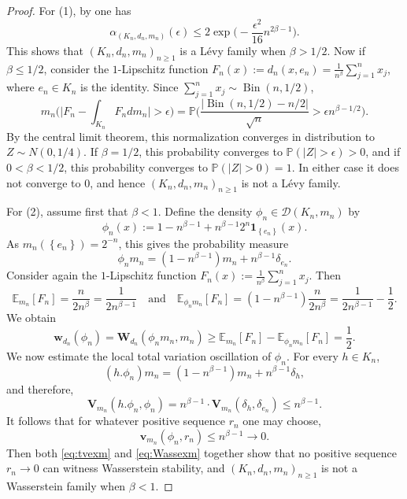 \documentclass{amsart}
\numberwithin{equation}{subsection}
\theoremstyle{plain}
\theoremstyle{definition}
\theoremstyle{plain}
\begin{document}
\begin{proof}
For (1), by \cite[Thms.~4.2.5, 4.3.19]{Pestov2006} one has
\[\alpha_{\left(K_{n},d_{n},m_{n}\right)}\left(\epsilon\right)\leq2\exp\Big(-\frac{\epsilon^{2}}{16}n^{2\beta-1}\Big).\]
This shows that \(\left(K_{n},d_{n},m_{n}\right)_{n\geq1}\) is a L\'{e}vy family when \(\beta>1/2\). Now if \(\beta\leq1/2\), consider the \(1\)-Lipschitz function \(F_{n}\left(x\right):=d_{n}\left(x,e_{n}\right)=\frac{1}{n^{\beta}}\sum_{j=1}^{n}x_{j}\), where \(e_{n}\in K_{n}\) is the identity. Since \(\sum_{j=1}^{n}x_{j}\sim\operatorname{Bin}\left(n,1/2\right)\),
\[m_{n}\Big(\big|F_{n}-\int_{K_{n}}F_{n}dm_{n}\big|>\epsilon\Big)=\mathbb{P}\Big(\frac{\left|\operatorname{Bin}\left(n,1/2\right)-n/2\right|}{\sqrt{n}}>\epsilon n^{\beta-1/2}\Big).\]
By the central limit theorem, this normalization converges in distribution to \(Z\sim N\left(0,1/4\right)\). If \(\beta=1/2\), this probability converges to \(\mathbb{P}\left(\left|Z\right|>\epsilon\right)>0\), and if \(0<\beta<1/2\), this probability converges to \(\mathbb{P}\left(\left|Z\right|>0\right)=1\). In either case it does not converge to \(0\), and hence \(\left(K_{n},d_{n},m_{n}\right)_{n\geq 1}\) is not a L\'{e}vy family.

\smallskip

For (2), assume first that \(\beta<1\). Define the density \(\phi_{n}\in\mathcal{D}\left(K_{n},m_{n}\right)\) by
\[\phi_{n}\left(x\right):=1-n^{\beta-1}+n^{\beta-1}2^{n}\mathbf{1}_{\left\{e_{n}\right\}}\left(x\right).\]
As \(m_{n}\left(\left\{e_{n}\right\}\right)=2^{-n}\), this gives the probability measure
\[\phi_{n}m_{n}=\left(1-n^{\beta-1}\right)m_{n}+n^{\beta-1}\delta_{e_{n}}.\]
Consider again the \(1\)-Lipschitz function \(F_{n}\left(x\right):=\frac{1}{n^{\beta}}\sum_{j=1}^{n}x_{j}\). Then
\[\mathbb{E}_{m_{n}}\left[F_{n}\right]=\frac{n}{2n^{\beta}}=\frac{1}{2n^{\beta-1}}\quad\text{and}\quad\mathbb{E}_{\phi_{n}m_{n}}\left[F_{n}\right]=\left(1-n^{\beta-1}\right)\frac{n}{2n^{\beta}}=\frac{1}{2n^{\beta-1}}-\frac{1}{2}.\]
We obtain
\begin{equation}\label{eq:tvexm}
\mathbf{w}_{d_{n}}\left(\phi_{n}\right)=\mathbf{W}_{d_{n}}\left(\phi_{n}m_{n},m_{n}\right)\geq\mathbb{E}_{m_{n}}\left[F_{n}\right]-\mathbb{E}_{\phi_{n}m_{n}}\left[F_{n}\right]=\frac{1}{2}.
\end{equation}
We now estimate the local total variation oscillation of \(\phi_{n}\). For every \(h\in K_{n}\),
\[\left(h.\phi_{n}\right)m_{n}=\left(1-n^{\beta-1}\right)m_{n}+n^{\beta-1}\delta_{h},\]
and therefore,
\[\mathbf{V}_{m_{n}}\left(h.\phi_{n},\phi_{n}\right)=n^{\beta-1}\cdot\mathbf{V}_{m_{n}}\left(\delta_{h},\delta_{e_{n}}\right)\leq n^{\beta-1}.\]
It follows that for whatever positive sequence \(r_{n}\) one may choose,
\begin{equation}\label{eq:Wassexm}
\mathbf{v}_{m_{n}}\left(\phi_{n},r_{n}\right)\leq n^{\beta-1}\to0.
\end{equation}
Then both \eqref{eq:tvexm} and \eqref{eq:Wassexm} together show that no positive sequence \(r_{n}\to0\) can witness Wasserstein stability, and \(\left(K_{n},d_{n},m_{n}\right)_{n\geq1}\) is not a Wasserstein family when \(\beta<1\).


\end{proof}
\end{document}
